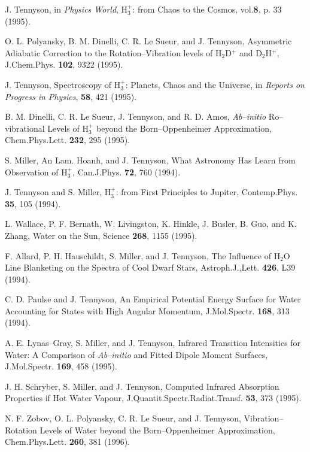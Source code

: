 \begin{thebibliography}{999}
J. Tennyson, in {\em Physics World}, 
H$_3^+$: from Chaos to the Cosmos,
vol.{\bf 8}, p. 33 (1995).

O. L. Polyansky, B. M. Dinelli, C. R. Le Sueur, and J. Tennyson,
Asymmetric Adiabatic Correction to the Rotation--Vibration levels
of H$_2$D$^+$ and D$_2$H$^+$,
J.Chem.Phys. {\bf 102}, 9322 (1995).

J. Tennyson, 
Spectroscopy of H$_3^+$: Planets, Chaos and the Universe,
in {\em Reports on Progress in Physics}, {\bf 58},
421 (1995).

B. M. Dinelli, C. R. Le Sueur, J. Tennyson, and R. D. Amos,
{\it Ab--initio} Ro--vibrational Levels of H$_3^+$ beyond the
Born--Oppenheimer Approximation,
Chem.Phys.Lett. {\bf 232}, 295 (1995).

S. Miller, An Lam. Hoanh, and J. Tennyson,
What Astronomy Has Learn from Observation of H$_3^+$,
Can.J.Phys. {\bf 72}, 760 (1994).

J. Tennyson and S. Miller, 
H$_3^+$: from First Principles to Jupiter,
Contemp.Phys. {\bf 35}, 105 (1994).


L. Wallace, P. F. Bernath, W. Livingston, K. Hinkle, J. Busler,
B. Guo, and K. Zhang, 
Water on the Sun,
Science {\bf 268}, 1155 (1995).

F. Allard, P. H. Hauschildt, S. Miller, and J. Tennyson,
The Influence of H$_2$O Line Blanketing on the Spectra of
Cool Dwarf Stars,
Astroph.J.,Lett. {\bf 426}, L39 (1994).

C. D. Paulse and J. Tennyson, 
An Empirical Potential Energy Surface for Water Accounting for
States with High Angular Momentum,
J.Mol.Spectr. {\bf 168}, 313 (1994).

A. E. Lynas--Gray, S. Miller, and J. Tennyson,
Infrared Transition Intensities for Water: A Comparison of
{\it Ab--initio} and Fitted Dipole Moment Surfaces,
J.Mol.Spectr. {\bf 169}, 458 (1995).

J. H. Schryber, S. Miller, and J. Tennyson,
Computed Infrared Absorption Properties if Hot Water Vapour,
J.Quantit.Spectr.Radiat.Transf. {\bf 53}, 373 (1995).


N. F. Zobov, O. L. Polyansky, C. R. Le Sueur, and J. Tennyson,
Vibration--Rotation Levels of Water beyond the 
Born--Oppenheimer Approximation,
Chem.Phys.Lett. {\bf 260}, 381 (1996).



\end{thebibliography}
